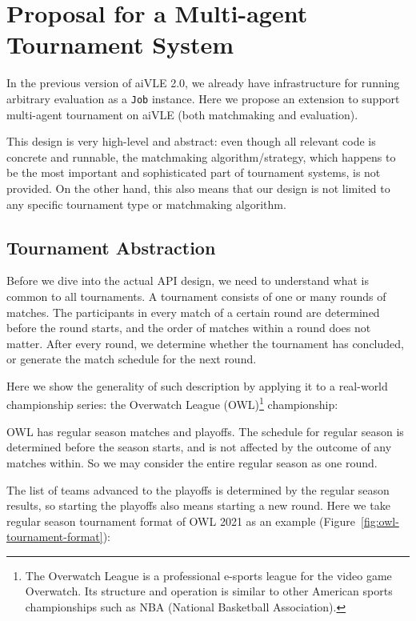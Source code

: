 \chapter{Proposal for a Multi-agent Tournament System}
\label{appendix:aivle-web_matchmaking}

In the previous version of aiVLE 2.0, we already have infrastructure for running arbitrary evaluation as a \texttt{Job} instance. Here we propose an extension to support multi-agent tournament on aiVLE (both matchmaking and evaluation).

This design is very high-level and abstract: even though all relevant code is concrete and runnable, the matchmaking algorithm/strategy, which happens to be the most important and sophisticated part of tournament systems, is not provided. On the other hand, this also means that our design is not limited to any specific tournament type or matchmaking algorithm.

\section{Tournament Abstraction}
\label{as:matchmaking-api_design-tournament_abstraction}
Before we dive into the actual API design, we need to understand what is common to all tournaments. A tournament consists of one or many rounds of matches. The participants in every match of a certain round are determined before the round starts, and the order of matches within a round does not matter. After every round, we determine whether the tournament has concluded, or generate the match schedule for the next round.

Here we show the generality of such description by applying it to a real-world championship series: the Overwatch League (OWL)\footnote{The Overwatch League is a professional e-sports league for the video game Overwatch. Its structure and operation is similar to other American sports championships such as NBA (National Basketball Association).} championship:

OWL has regular season matches and playoffs. The schedule for regular season is determined before the season starts, and is not affected by the outcome of any matches within. So we may consider the entire regular season as one round.

The list of teams advanced to the playoffs is determined by the regular season results, so starting the playoffs also means starting a new round. Here we take regular season tournament format of OWL 2021 as an example (Figure~\ref{fig:owl-tournament-format}):

